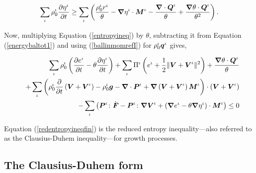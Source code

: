 \begin{equation}
\sum\limits_{\iota}\rho_0^\iota\frac{\partial\eta^\iota}{\partial
t} \geq \sum\limits_{\iota}\left(\frac{\rho_0^\iota
r^\iota}{\theta} -\mbox{\boldmath$\nabla$}\eta^\iota\cdot\mbox{\boldmath$ M$}^\iota -
\frac{\mbox{\boldmath$\nabla$}\cdot\mbox{\boldmath$ Q$}^\iota}{\theta} +
\frac{\mbox{\boldmath$\nabla$}\theta\cdot\mbox{\boldmath$ Q$}^\iota}{\theta^2}\right).
\label{entropyineq}
\end{equation}

Now, multiplying Equation (\ref{entropyineq}) by $\theta$,
subtracting it from Equation (\ref{energybaltot1}) and using
(\ref{ballinmomrefI}) for $\rho_0^\iota\mbox{\boldmath$ q$}^\iota$ gives,

\begin{eqnarray}
& &\sum\limits_{\iota}\rho^\iota_0\left(\frac{\partial
e^\iota}{\partial t} -\theta\frac{\partial\eta^\iota}{\partial
t}\right) +\sum\limits_{\iota}\Pi^\iota\left(e^\iota +
\frac{1}{2}\Vert\mbox{\boldmath$ V$}+\mbox{\boldmath$ V$}^\iota\Vert^2\right) +
\frac{\mbox{\boldmath$\nabla$}\theta\cdot\mbox{\boldmath$ Q$}^\iota}{\theta}
\nonumber\\
& &+\sum\limits_{\iota} \left(\rho^\iota_0\frac{\partial}{\partial
t}\left(\mbox{\boldmath$ V$}+\mbox{\boldmath$ V$}^\iota\right) - \rho_0^\iota\mbox{\boldmath$ g$} -
\mbox{\boldmath$\nabla$}\cdot\mbox{\boldmath$ P$}^\iota +
\mbox{\boldmath$\nabla$}\left(\mbox{\boldmath$ V$}+\mbox{\boldmath$ V$}^\iota\right)\mbox{\boldmath$ M$}^\iota\right)\cdot\left(\mbox{\boldmath$ V$}+\mbox{\boldmath$ V$}^\iota\right)
\nonumber\\
& &-\sum\limits_{\iota}\left(\mbox{\boldmath$ P$}^\iota\colon\dot{\mbox{\boldmath$ F$}} -
\mbox{\boldmath$ P$}^\iota\colon\mbox{\boldmath$\nabla$}\mbox{\boldmath$ V$}^\iota + \left(\mbox{\boldmath$\nabla$} e^\iota -
\theta\mbox{\boldmath$\nabla$}\eta^\iota\right) \cdot\mbox{\boldmath$ M$}^\iota\right)\leq 0
\label{redentropyineqfin}
\end{eqnarray}

\noindent Equation (\ref{redentropyineqfin}) is the reduced
entropy inequality---also referred to as the Clausius-Duhem
inequality---for growth processes.

\subsection{The Clausius-Duhem form}
\label{clausius-duhem-form}

